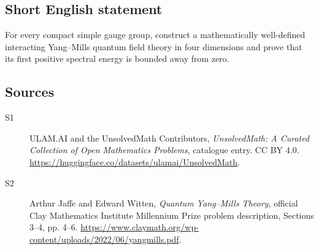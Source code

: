 \documentclass[11pt]{article}
\begin{document}
\subsection{Short English statement}
For every compact simple gauge group, construct a mathematically well-defined interacting Yang--Mills quantum field theory in four dimensions and prove that its first positive spectral energy is bounded away from zero.
\subsection{Sources}
\begin{description}
\item[\hypertarget{source:statement:1}{S1}] ULAM.AI and the UnsolvedMath Contributors, \emph{UnsolvedMath: A Curated Collection of Open Mathematics Problems}, catalogue entry. CC BY 4.0. \url{https://huggingface.co/datasets/ulamai/UnsolvedMath}.
\item[\hypertarget{source:statement:2}{S2}] Arthur Jaffe and Edward Witten, \emph{Quantum Yang--Mills Theory}, official Clay Mathematics Institute Millennium Prize problem description, Sections 3--4, pp. 4--6. \url{https://www.claymath.org/wp-content/uploads/2022/06/yangmills.pdf}.
\end{description}
\label{end:statement}
\end{document}
